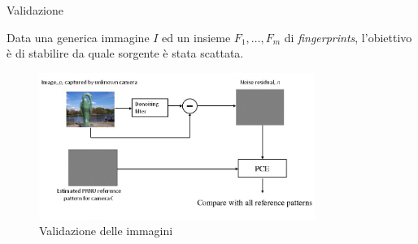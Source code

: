 \begin{tframe}{Validazione}

Data una generica immagine $I$ ed un insieme $F_1, \ldots, F_m$ di \emph{fingerprints}, l'obiettivo è di stabilire da quale sorgente è stata scattata.

\begin{figure}[h]
\begin{center}
\includegraphics[width=0.8\textwidth]{../images/validation_2}
\end{center}
  \caption{Validazione delle immagini}
\label{fig:validation}
\end{figure}
\end{tframe}